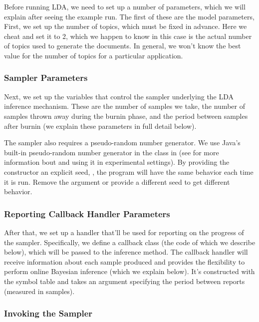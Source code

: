 Before running LDA, we need to set up a number of parameters, which we
will explain after seeing the example run.  The first of these are the
model parameters,
%
%
First, we set up the number of topics, which must be fixed in advance.
Here we cheat and set it to 2, which we happen to know in this case is
the actual number of topics used to generate the documents.  In
general, we won't know the best value for the number of topics for a
particular application.

\subsubsection{Sampler Parameters}

Next, we set up the variables that control the sampler underlying
the LDA inference mechanism.
%
%
These are the number of samples we take, the number of samples thrown
away during the burnin phase, and the period between samples after
burnin (we explain these parameters in full detail below).  

The sampler also requires a pseudo-random number generator.  We use
Java's built-in pseudo-random number generator in the class
 in  (see  for
more information bout  and using it in experimental
settings).  By providing the constructor an explicit seed, ,
the program will have the same behavior each time it is run.  Remove
the argument or provide a different seed to get different behavior.

\subsubsection{Reporting Callback Handler Parameters}

After that, we set up a handler that'll be used for reporting on the
progress of the sampler.  Specifically, we define a callback class
 (the code of which we describe
below), which will be passed to the inference method.
%
%
The callback handler will receive information about each sample
produced and provides the flexibility to perform online Bayesian
inference (which we explain below).  It's constructed with the
symbol table and takes an argument specifying the period between
reports (measured in samples).

\subsubsection{Invoking the Sampler}

